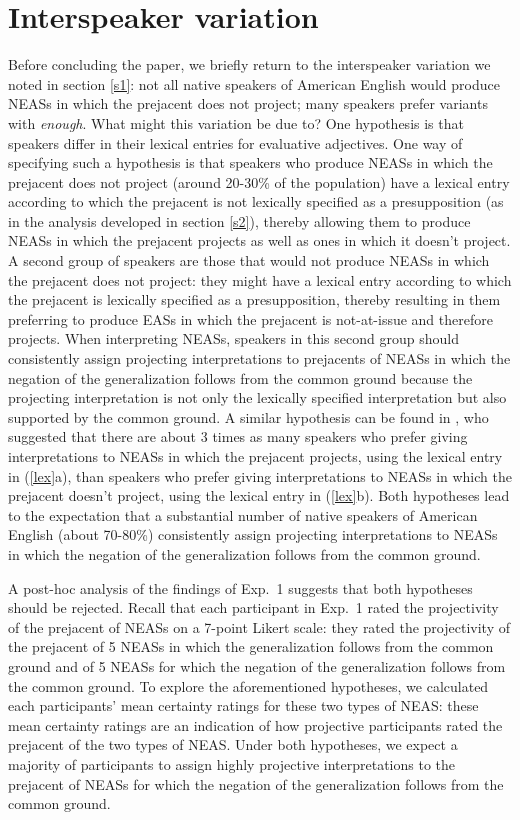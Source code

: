 \documentclass[11pt,fleqn]{article}
\newcommand{\6}{\mbox{$[\hspace*{-.6mm}[$}}
\newcommand{\9}{\mbox{$]\hspace*{-.6mm}]$}}
\begin{document}
\section{Interspeaker variation}\label{s5}

Before concluding the paper, we briefly return to the interspeaker variation we noted in section \ref{s1}: not all native speakers of American English would produce NEASs in which the prejacent does not project; many speakers prefer variants with {\em enough}. What might this variation be due to? One hypothesis is that speakers differ in their lexical entries for evaluative adjectives. One way of specifying such a hypothesis is that speakers who produce NEASs in which the prejacent does not project (around 20-30\% of the population) have a lexical entry according to which the prejacent is not lexically specified as a presupposition (as in the analysis developed in section \ref{s2}), thereby allowing them to produce NEASs in which the prejacent projects as well as ones in which it doesn't project. A second group of speakers are those that would not produce NEASs in which the prejacent does not project: they might have a lexical entry according to which the prejacent is lexically specified as a presupposition, thereby resulting in them preferring to produce EASs in which the prejacent is not-at-issue and therefore projects. When interpreting NEASs, speakers in this second group should consistently assign projecting interpretations to prejacents of NEASs in which the negation of the generalization follows from the common ground because the projecting interpretation is not only the lexically specified interpretation but also supported by the common ground. A similar hypothesis can be found in \citet[243]{karttunen-etal2014}, who suggested that there are about 3 times as many speakers who prefer giving interpretations to NEASs in which the prejacent projects, using the lexical entry in (\ref{lex}a), than speakers who prefer giving interpretations to NEASs in which the prejacent doesn't project, using the lexical entry in (\ref{lex}b). Both hypotheses lead to the expectation that a substantial number of native speakers of American English (about 70-80\%) consistently assign projecting interpretations to NEASs in which the negation of the generalization follows from the common ground.

A post-hoc analysis of the findings of Exp.~1 suggests that both hypotheses should be rejected. Recall that each participant in Exp.~1 rated the projectivity of the prejacent of NEASs on a 7-point Likert scale: they rated the projectivity of the prejacent of 5 NEASs in which the generalization follows from the common ground and of 5 NEASs for which the negation of the generalization follows from the common ground. To explore the aforementioned hypotheses, we calculated each participants' mean certainty ratings for these two types of NEAS: these mean certainty ratings are an indication of how projective participants rated the prejacent of the two types of NEAS. Under both hypotheses, we expect a majority of participants to assign highly projective interpretations to the prejacent of NEASs for which the negation of the generalization follows from the common ground. 
\end{document}
